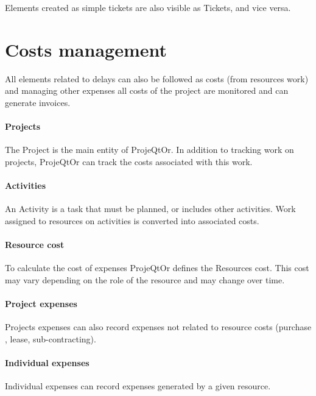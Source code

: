 \documentclass[letterpaper,10pt,english]{sphinxmanual}
\begin{document}
Elements created as simple tickets are also visible as Tickets, and vice versa.
\newpage
{}

\section{Costs management}
\label{Features:index-17}\label{Features:costs-management}
All elements related to delays can also be followed as costs (from resources work) and managing other expenses all costs of the project are monitored and can generate invoices.

\paragraph{Projects}

The Project is the main entity of ProjeQtOr.
In addition to tracking work on projects, ProjeQtOr can track the costs associated with this work.

\paragraph{Activities}

An Activity is a task that must be planned, or includes other activities.
Work assigned to resources on activities is converted into associated costs.

\paragraph{Resource cost}

To calculate the cost of expenses ProjeQtOr  defines the Resources cost.
This cost may vary depending on the role of the resource and may change over time.

\paragraph{Project expenses}

Projects expenses can also record expenses not related to resource costs (purchase , lease, sub-contracting).

\paragraph{Individual expenses}

Individual expenses can record expenses generated by a given resource.
\end{document}
